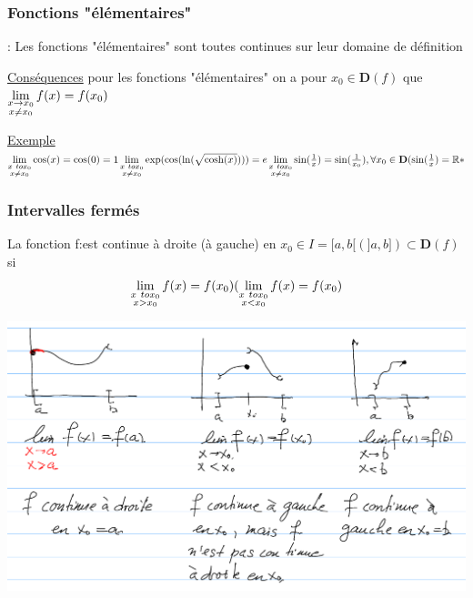 \documentclass[12pt,a4paper]{article}
\newcommand{\Exemple}{\underline{Exemple} }
\begin{document}
{\subsubsection{Fonctions "élémentaires"}

\begin{boite}
\Theoreme : Les fonctions "élémentaires" sont toutes continues sur leur domaine de définition
\end{boite}

\begin{boite}
\underline{Conséquences} pour les fonctions "élémentaires" on a pour $x_0 \in \mathbf{D}(f)$ que $\lim\limits_{\substack{x \to x_0 \\ x \neq x_0}} f(x) = f(x_0)$
\end{boite}
\Exemple $\lim\limits_{\substack{x \ to x_0 \\ x \neq x_0}} \cos(x) = \cos(0) = 1\\
\lim\limits_{\substack{x \ to x_0 \\ x \neq x_0}} \exp(\cos(\ln(\sqrt{\cosh(x)}))) = e\\
\lim\limits_{\substack{x \ to x_0 \\ x \neq x_0}} \sin(\frac{1}{x}) = \sin(\frac{1}{x_0}),\forall x_0 \in \mathbf{D}(\sin(\frac{1}{x}) = \mathbb{R}*$
\subsubsection{Intervalles fermés}
\begin{boite}
\Definition La fonction f:\rtor est continue à droite (à gauche) en $x_0 \in I = [a,b[ (]a,b]) \subset \mathbf{D}(f)$ si 
\begin{equation}
\lim\limits_{\substack{x \ to x_0 \\ x > x_0}} f(x) = f(x_0) (\lim\limits_{\substack{x \ to x_0 \\ x < x_0}} f(x) = f(x_0)
\end{equation}
\end{boite}
\includegraphics[scale=0.5]{illustrations_Analyse/interv_ferme}

}
\end{document}
